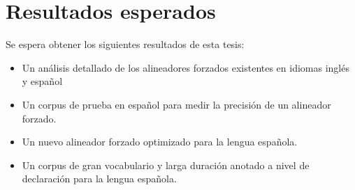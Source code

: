 



\section{Resultados esperados}

Se espera obtener los siguientes resultados de esta tesis:

\begin{itemize}
    \item Un análisis detallado de los alineadores forzados existentes en idiomas inglés y español
    \item Un corpus de prueba en español para medir la precisión de un alineador forzado.
    \item Un nuevo alineador forzado optimizado para la lengua española.
    \item Un corpus de gran vocabulario y larga duración anotado a nivel de declaración para la lengua española.
\end{itemize}






